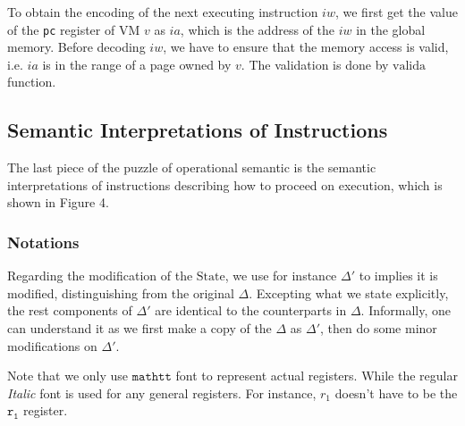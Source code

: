 \documentclass[a4paper]{article}
\newcommand*{\STATE}{\text{State}}
\newcommand*{\valida}{\text{valida}}
\begin{document}
To obtain the encoding of the next executing instruction $iw$, we first get the
value of the \texttt{pc} register of VM $v$ as $ia$, which is the address of the
$iw$ in the global memory. Before decoding $iw$, we have to ensure that the
memory access is valid, i.e. $ia$ is in the range of a page owned by $v$.
The validation is done by $\valida$ function.


\subsection{Semantic Interpretations of Instructions}

The last piece of the puzzle of operational semantic
is the semantic interpretations of instructions describing how to proceed on
execution, which is shown in Figure 4.

\subsubsection{Notations}
Regarding the modification of the $\STATE$, we use for instance $\Delta'$ to
implies it is modified, distinguishing from the original $\Delta$. Excepting
what we state explicitly, the rest components of $\Delta'$ are identical to the
counterparts in $\Delta$. Informally, one can understand it as we first make a
copy of the $\Delta$ as $\Delta'$, then do some minor modifications on
$\Delta'$.

Note that we only use $\mathtt{mathtt}$ font to represent actual registers.
While the regular \emph{Italic} font is used for any general registers. For
instance, $r_{1}$ doesn't have to be the $\mathtt{r_{1}}$ register.
\end{document}
